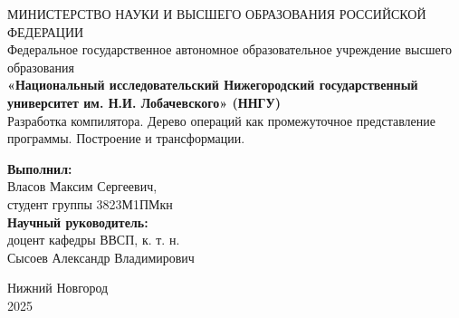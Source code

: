\documentclass[a4paper,12pt]{extarticle}
\begin{document}
\begin{titlepage}
  \begin{center}
    МИНИСТЕРСТВО НАУКИ И ВЫСШЕГО ОБРАЗОВАНИЯ РОССИЙСКОЙ ФЕДЕРАЦИИ\\
    Федеральное государственное автономное образовательное учреждение высшего образования\\
    \textbf{«Национальный исследовательский Нижегородский государственный университет им. Н.И. Лобачевского» (ННГУ)}\\
    \vspace*{\fill}
    {\LARGE
      Разработка компилятора.
      Дерево операций как промежуточное представление программы.
      Построение и трансформации.
    }\\
    \vspace{2cm}
  \end{center}
  \hfill
  \begin{minipage}{0.45\textwidth}
    \raggedright
    \textbf{Выполнил:}\\
    Власов Максим Сергеевич,\\
    студент группы 3823М1ПМкн\\
    \vspace{1cm}
    \textbf{Научный руководитель:}\\
    доцент кафедры ВВСП, к. т. н.\\
    Сысоев Александр Владимирович
  \end{minipage}
  \vspace*{\fill}
  \begin{center}
    Нижний Новгород\\
    2025
  \end{center}
\end{titlepage}

\newpage
\setcounter{page}{2}
\tableofcontents













\newpage
{}
\printbibliography
\end{document}

